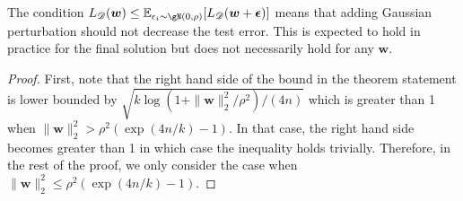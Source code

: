\documentclass{article} %
\begin{document}
The condition $L_\mathscr{D}(\boldsymbol{w}) \leq \mathbb{E}_{\epsilon_i \sim \gN(0,\rho)}[L_\mathscr{D}(\boldsymbol{w}+\boldsymbol{\epsilon})]$ means that adding Gaussian perturbation should not decrease the test error. This is expected to hold in practice for the final solution but does not necessarily hold for any $\boldsymbol{w}$.
\begin{proof}
First, note that the right hand side of the bound in the theorem statement is lower bounded by $\sqrt{k\log(1+\|\boldsymbol{w}\|_2^2/\rho^2)/(4n)}$ which is greater than 1 when $\|\boldsymbol{w}\|_2^2 >\rho^2(\exp(4n/k)-1)$. In that case, the right hand side becomes greater than 1 in which case the inequality holds trivially. Therefore, in the rest of the proof, we only consider the case when $\|\boldsymbol{w}\|_2^2 \leq \rho^2(\exp(4n/k)-1)$.


\end{proof}
\end{document}
